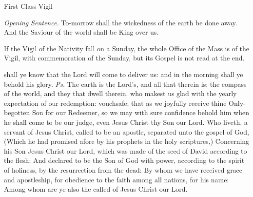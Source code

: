 \begin{inhead}
{First Class Vigil}
\end{inhead}
\par\noindent
\textit{Opening Sentence.} To-morrow shall the wickedness of the earth be done away. And the Saviour of the world shall be King over us.\par
{}
\begin{rubric}
    If the Vigil of the Nativity fall on a Sunday, the whole Office of the Mass is of the Vigil, with commemoration of the Sunday, but its Gospel is not read at the end.
\end{rubric}
\introit
{} shall ye know that the Lord will come to deliver us: and in the morning shall ye behold his glory. \textit{Ps.} The earth is the Lord's, and all that therein is; the compass of the world, and they that dwell therein.
\collect
{} who makest us glad with the yearly expectation of our redemption: vouchsafe; that as we joyfully receive thine Only-begotten Son for our Redeemer, so we may with sure confidence behold him when he shall come to be our judge, even Jesus Christ thy Son our Lord. Who liveth.
 a servant of Jesus Christ, called to be an apostle, separated unto the gospel of God, (Which he had promised afore by his prophets in the holy scriptures,) Concerning his Son Jesus Christ our Lord, which was made of the seed of David according to the flesh; And declared to be the Son of God with power, according to the spirit of holiness, by the resurrection from the dead: By whom we have received grace and apostleship, for obedience to the faith among all nations, for his name: Among whom are ye also the called of Jesus Christ our Lord.

